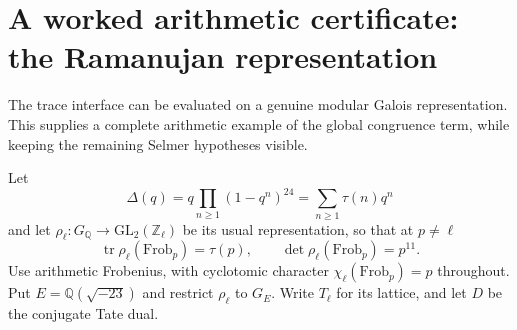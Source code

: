 \section{A worked arithmetic certificate: the Ramanujan representation}
\label{sec:delta-congruence}

The trace interface can be evaluated on a genuine modular Galois
representation.  This supplies a complete arithmetic example of the
global congruence term, while keeping the remaining Selmer hypotheses
visible.

Let
\[
 \Delta(q)=q\prod_{n\geq1}(1-q^n)^{24}
          =\sum_{n\geq1}\tau(n)q^n
\]
and let $\rho_\ell:G_{\mathbb Q}\to\mathrm{GL}_2(\mathbb Z_\ell)$
be its usual representation, so that at $p\ne\ell$
\[
 \operatorname{tr}\rho_\ell(\mathrm{Frob}_p)=\tau(p),
 \qquad \det\rho_\ell(\mathrm{Frob}_p)=p^{11}.
\]
Use arithmetic Frobenius, with cyclotomic character
$\chi_\ell(\mathrm{Frob}_p)=p$ throughout.
Put $E=\mathbb Q(\sqrt{-23})$ and restrict $\rho_\ell$ to $G_E$.
Write $T_\ell$ for its lattice, and let $D$ be the conjugate Tate dual.

